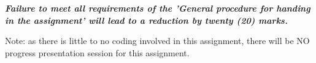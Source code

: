 \documentclass{pracs}
\begin{document}
\textbf{\emph{Failure to meet all requirements of the 'General procedure for handing in the assignment' will lead to a reduction by twenty (20) marks.}}

Note: as there is little to no coding involved in this assignment, there will be NO progress presentation session for this assignment.

%
\end{document}
